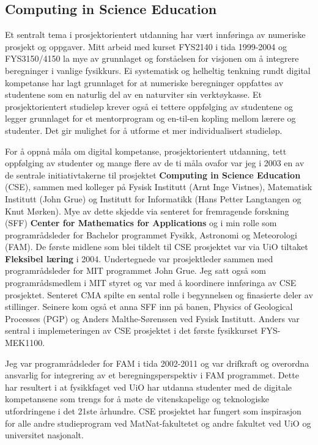 \documentclass[aps,floatfix,preprint]{revtex4-1}
\begin{document}
\newpage

\subsection*{Computing in Science Education} 

Et sentralt tema i prosjektorientert utdanning har
vært innføringa av numeriske prosjekt og oppgaver.  Mitt arbeid med
kurset FYS2140 i tida 1999-2004 og FYS3150/4150 la mye av grunnlaget og forståelsen
for visjonen om å integrere beregninger i vanlige fysikkurs. Ei
systematisk og helheltig tenkning rundt digital kompetanse har lagt
grunnlaget for at numeriske beregninger oppfattes av studentene som en
naturlig del av en naturviter sin verktøykasse.  Et prosjektorientert
studieløp krever også ei tettere oppfølging av studentene og legger grunnlaget for et mentorprogram og en-til-en kopling mellom lærere og studenter. Det gir mulighet for å utforme et mer individualisert studieløp.

For å oppnå måla om digital kompetanse, prosjektorientert utdanning,
tett oppfølging av studenter og mange flere av de ti måla ovafor var
jeg i 2003 en av de sentrale initiativtakerne til prosjektet
\textbf{Computing in Science Education} (CSE), sammen med kolleger på
Fysisk Institutt (Arnt Inge Vistnes), Matematisk Institutt (John Grue)
og Institutt for Informatikk (Hans Petter Langtangen og Knut
Mørken). Mye av dette skjedde via senteret for fremragende forskning
(SFF) \textbf{Center for Mathematics for Applications} og i min rolle
som programrådsleder for Bachelor programmet Fysikk, Astronomi og
Meteorologi (FAM). De første midlene som blei tildelt til CSE
prosjektet var via UiO tiltaket \textbf{Fleksibel læring} i
2004. Undertegnede var prosjektleder sammen med programrådsleder for
MIT programmet John Grue. Jeg satt også som programrådsmedlem i MIT
styret og var med å koordinere innføringa av CSE prosjektet.  Senteret
CMA spilte en sental rolle i begynnelsen og finasierte deler av
stillinger. Seinere kom også et anna SFF inn på banen, Physics of
Geological Processes (PGP) og Anders Malthe-Sørenssen ved Fysisk
Institutt. Anders var sentral i implemeteringen av CSE prosjektet i
det første fysikkurset FYS-MEK1100.

Jeg var programrådsleder for FAM i tida 2002-2011 og var drifkraft
og overordna ansvarlig for integrering av et beregningsperspektiv i
FAM programmet. Dette har resultert i at fysikkfaget ved UiO har
utdanna studenter med de digitale kompetansene som trengs for å møte
de vitenskapelige og teknologiske utfordringene i det 21ste
århundre. CSE prosjektet har fungert som inspirasjon for alle andre
studieprogram ved MatNat-fakultetet og andre fakultet ved UiO og
universitet nasjonalt.
\end{document}
